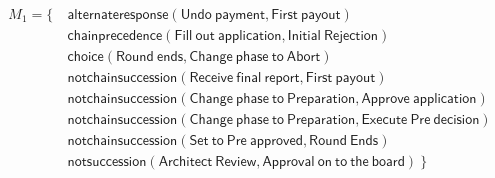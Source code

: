 {\small{
\begin{align*}
M_1 = \{ \ & \mathsf{ alternateresponse(Undo\ payment, First\ payout)} \\
& \mathsf{ chainprecedence(Fill\ out\ application, Initial\ Rejection)} \\
& \mathsf{ choice(Round\ ends, Change\ phase\ to\ Abort)} \\
& \mathsf{ notchainsuccession(Receive\ final\ report, First\ payout)} \\
& \mathsf{ notchainsuccession(Change\ phase\ to\ Preparation, Approve\ application)} \\
& \mathsf{ notchainsuccession(Change\ phase\ to\ Preparation, Execute\ Pre\ decision)} \\
& \mathsf{ notchainsuccession(Set\ to\ Pre\ approved, Round\ Ends)} \\
& \mathsf{ notsuccession(Architect\ Review, Approval\ on\ to\ the\ board)} \ \} 
\end{align*}
}}


